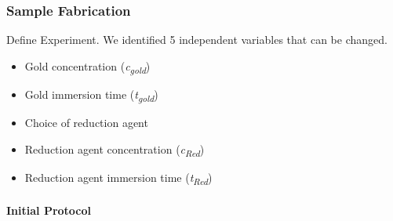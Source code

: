 \subsubsection{Sample Fabrication}
\label{subsec:SampleFab}

Define Experiment. We identified 5 independent variables that can be changed.


\begin{multicols}{2}
\begin{itemize}
    \item Gold concentration (\textit{c\textsubscript{gold}})
    \item Gold immersion time (\textit{t\textsubscript{gold}})
    \item Choice of reduction agent
    \item Reduction agent concentration (\textit{c\textsubscript{Red}})
    \item Reduction agent immersion time (\textit{t\textsubscript{Red}})
\end{itemize}
\end{multicols}




\paragraph{Initial Protocol}

